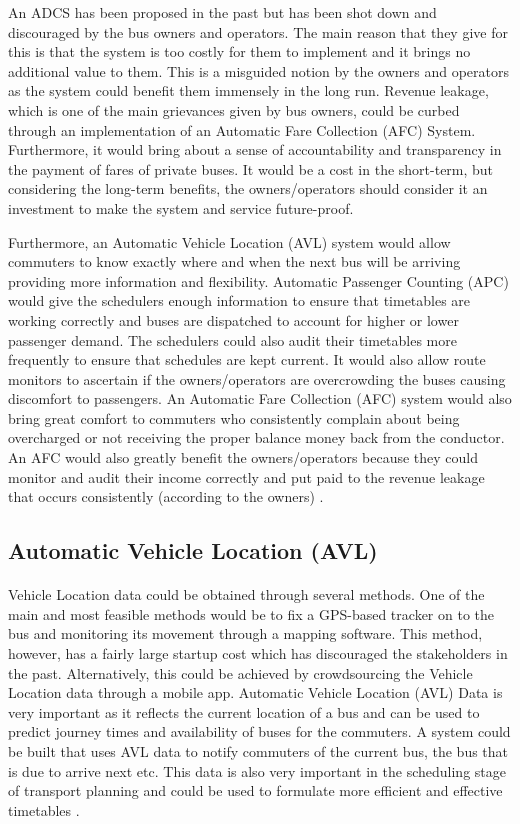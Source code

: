 An ADCS has been proposed in the past but has been shot down and discouraged by the bus owners and operators. The main reason that they give for this is that the system is too costly for them to implement and it brings no additional value to them. This is a misguided notion by the owners and operators as the system could benefit them immensely in the long run. Revenue leakage, which is one of the main grievances given by bus owners, could be curbed through an implementation of an Automatic Fare Collection (AFC) System. Furthermore, it would bring about a sense of accountability and transparency in the payment of fares of private buses. It would be a cost in the short-term, but considering the long-term benefits, the owners/operators should consider it an investment to make the system and service future-proof.

Furthermore, an Automatic Vehicle Location (AVL) system would allow commuters to know exactly where and when the next bus will be arriving providing more information and flexibility. Automatic Passenger Counting (APC) would give the schedulers enough information to ensure that timetables are working correctly and buses are dispatched to account for higher or lower passenger demand. The schedulers could also audit their timetables more frequently to ensure that schedules are kept current. It would also allow route monitors to ascertain if the owners/operators are overcrowding the buses causing discomfort to passengers. An Automatic Fare Collection (AFC) system would also bring great comfort to commuters who consistently complain about being overcharged or not receiving the proper balance money back from the conductor. An AFC would also greatly benefit the owners/operators because they could monitor and audit their income correctly and put paid to the revenue leakage that occurs consistently (according to the owners) \cite{Wilson2008, Wilson2009, Wilson2012, Fijalkowski2010}.

\subsection{Automatic Vehicle Location (AVL)}

\paragraph{ } Vehicle Location data could be obtained through several methods. One of the main and most feasible methods would be to fix a GPS-based tracker on to the bus and monitoring its movement through a mapping software. This method, however, has a fairly large startup cost which has discouraged the stakeholders in the past. Alternatively, this could be achieved by crowdsourcing the Vehicle Location data through a mobile app. Automatic Vehicle Location (AVL) Data is very important as it reflects the current location of a bus and can be used to predict journey times and availability of buses for the commuters. A system could be built that uses AVL data to notify commuters of the current bus, the bus that is due to arrive next etc. This data is also very important in the scheduling stage of transport planning and could be used to formulate more efficient and effective timetables \cite{Wilson2009}.

